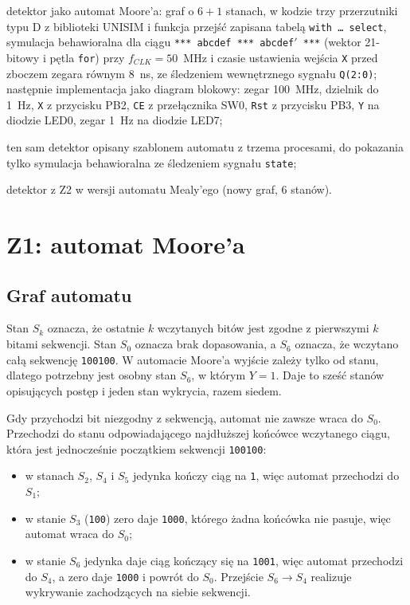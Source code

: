 \documentclass[11pt,a4paper]{article}
\begin{document}
\begin{description}[leftmargin=2.2em,style=sameline]
  \item[Z1] detektor jako automat Moore'a: graf o $6 + 1$ stanach, w kodzie trzy przerzutniki typu D z biblioteki UNISIM i funkcja przejść zapisana tabelą \texttt{with \dots\ select}, symulacja behawioralna dla ciągu \texttt{*** abcdef *** abcdef\ensuremath{'} ***} (wektor 21-bitowy i pętla \texttt{for}) przy $f_{CLK} = 50$~MHz i czasie ustawienia wejścia \texttt{X} przed zboczem zegara równym 8~ns, ze śledzeniem wewnętrznego sygnału \texttt{Q(2:0)}; następnie implementacja jako diagram blokowy: zegar 100~MHz, dzielnik do 1~Hz, \texttt{X} z przycisku PB2, \texttt{CE} z przełącznika SW0, \texttt{Rst} z przycisku PB3, \texttt{Y} na diodzie LED0, zegar 1~Hz na diodzie LED7;
  \item[Z2] ten sam detektor opisany szablonem automatu z trzema procesami, do pokazania tylko symulacja behawioralna ze śledzeniem sygnału \texttt{state};
  \item[Z3] detektor z Z2 w wersji automatu Mealy'ego (nowy graf, 6 stanów).
\end{description}

\section{Z1: automat Moore'a}

\subsection{Graf automatu}

Stan $S_k$ oznacza, że ostatnie $k$ wczytanych bitów jest zgodne z pierwszymi $k$ bitami sekwencji. Stan $S_0$ oznacza brak dopasowania, a $S_6$ oznacza, że wczytano całą sekwencję \texttt{100100}. W automacie Moore'a wyjście zależy tylko od stanu, dlatego potrzebny jest osobny stan $S_6$, w którym $Y = 1$. Daje to sześć stanów opisujących postęp i jeden stan wykrycia, razem siedem.

Gdy przychodzi bit niezgodny z sekwencją, automat nie zawsze wraca do $S_0$. Przechodzi do stanu odpowiadającego najdłuższej końcówce wczytanego ciągu, która jest jednocześnie początkiem sekwencji \texttt{100100}:
\begin{itemize}[itemsep=0pt]
  \item w stanach $S_2$, $S_4$ i $S_5$ jedynka kończy ciąg na \texttt{1}, więc automat przechodzi do $S_1$;
  \item w stanie $S_3$ (\texttt{100}) zero daje \texttt{1000}, którego żadna końcówka nie pasuje, więc automat wraca do $S_0$;
  \item w stanie $S_6$ jedynka daje ciąg kończący się na \texttt{1001}, więc automat przechodzi do $S_4$, a zero daje \texttt{1000} i powrót do $S_0$. Przejście $S_6 \to S_4$ realizuje wykrywanie zachodzących na siebie sekwencji.
\end{itemize}
\end{document}
